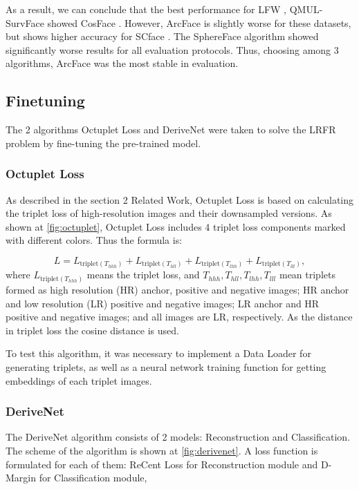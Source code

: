 \documentclass[11pt,a4paper]{article}
\begin{document}
As a result, we can conclude that the best performance for LFW \cite{lfw}, QMUL-SurvFace \cite{qmul} showed CosFace \cite{cosface}. However, ArcFace \cite{arcface} is slightly worse for these datasets, but shows higher accuracy for SCface \cite{scface}. The SphereFace \cite{sphereface} algorithm showed significantly worse results for all evaluation protocols. Thus, choosing among 3 algorithms, ArcFace \cite{arcface} was the most stable in evaluation. 

\subsection{Finetuning}
The 2 algorithms Octuplet Loss \cite{26} and DeriveNet \cite{derivenet} were taken to solve the LRFR problem by fine-tuning the pre-trained model. 

\subsubsection{Octuplet Loss}
As described in the section 2 Related Work, Octuplet Loss \cite{26} is based on calculating the triplet loss \cite{tripletLoss} of high-resolution images and their downsampled versions. As shown at \ref{fig:octuplet}, Octuplet Loss \cite{26} includes 4 triplet loss components marked with different colors. Thus the formula is: 

$$L = L_{\mathrm{triplet} (T_{hhh})} + L_{\mathrm{triplet} (T_{hll})} + L_{\mathrm{triplet} (T_{lhh})} + L_{\mathrm{triplet} (T_{lll})},$$ 
where $L_{\mathrm{triplet} (T_{hhh})}$ means the triplet loss, and $T_{hhh}, T_{hll}, T_{lhh}, T_{lll}$ mean triplets formed as high resolution (HR) anchor, positive and negative images; HR anchor and low resolution (LR) positive and negative images; LR anchor and HR positive and negative images; and all images are LR, respectively. As the distance in triplet loss the cosine distance is used. 

To test this algorithm, it was necessary to implement a Data Loader for generating triplets, as well as a neural network training function for getting  embeddings of each triplet images.

\subsubsection{DeriveNet} 
The DeriveNet \cite{derivenet} algorithm consists of 2 models: Reconstruction and Classification. The scheme of the algorithm is shown at \ref{fig:derivenet}. A loss function is formulated for each of them: ReCent Loss for Reconstruction module and D-Margin for Classification module, 
\end{document}
